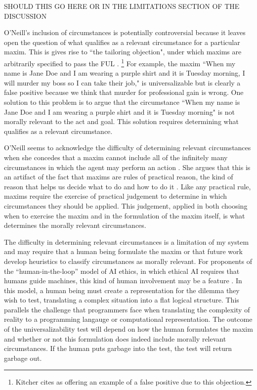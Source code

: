\begin{isabellebody}
\begin{isamarkuptext}
\color{red} SHOULD THIS GO HERE OR IN THE LIMITATIONS SECTION OF THE DISCUSSION

O'Neill's inclusion of circumstances is potentially controversial because it leaves open the question of what qualifies as a 
relevant circumstance for a particular maxim. This is gives rise to ``the tailoring objection", 
under which maxims are arbitrarily specified to pass the FUL  \citep[217]{whatisamaxim}. \footnote{Kitcher
cites \citet{kantsethicalthought} as offering an example of a false positive due to this objection.} For example, the maxim ``When my name is Jane Doe
and I am wearing a purple shirt and it is Tuesday morning, I will murder my boss so I can take their job," 
is universalizable but is clearly a false positive because we think that murder for professional gain is wrong. 
One solution to this problem is to argue that the circumstance ``When my name is Jane Doe and I am wearing a 
purple shirt and it is Tuesday morning" is not morally relevant 
to the act and goal. This solution requires determining what qualifies as a relevant circumstance.

O'Neill seems to acknowledge the difficulty of determining relevant circumstances when she concedes that a maxim cannot include all 
of the infinitely many circumstances in which the agent may perform an action \citep[4:428]{actingonprinciple}. She argues that this is 
an artifact of the fact that maxims are rules of practical reason, the kind of reason that helps us decide what to do 
and how to do it \citep{bok}. Like any practical rule, 
maxims require the exercise of practical judgement to determine in which circumstances they should be applied. 
This judgement, applied in both choosing when to exercise the maxim and in the formulation of the maxim 
itself, is what determines the morally relevant circumstances.

The difficulty in determining relevant circumstances is a limitation of my system and may require that a 
human being formulate the maxim or that future work develop heuristics to classify circumstances as morally 
relevant. For proponents of the ``human-in-the-loop'' model of AI ethics, in which ethical AI requires that 
humans guide machines, this kind of human involvement may be a feature \citep{loop}. In this model, 
a human being must create a representation for the dilemma they wish to test, translating 
a complex situation into a flat logical structure. This parallels the challenge that programmers 
face when translating the complexity of reality to a programming langauge or computational representation. 
The outcome of the universalizability test will depend on how the human formulates the maxim
and whether or not this formulation does indeed include morally relevant circumstances. If the human puts 
garbage into the test, the test will return garbage out.


\end{isamarkuptext}
\end{isabellebody}
